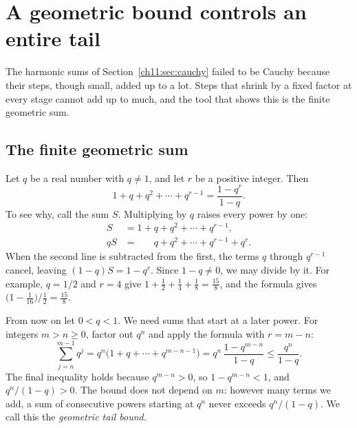 \section{A geometric bound controls an entire tail}\label{ch11:sec:geometric}
The harmonic sums of Section~\ref{ch11:sec:cauchy} failed to be Cauchy because their steps, though small, added up to a lot. Steps that shrink by a fixed factor at every stage cannot add up to much, and the tool that shows this is the finite geometric sum.

\subsection*{The finite geometric sum}
Let $q$ be a real number with $q\ne1$, and let $r$ be a positive integer. Then
\[
1+q+q^2+\cdots+q^{r-1}=\frac{1-q^r}{1-q}.
\]
To see why, call the sum $S$. Multiplying by $q$ raises every power by one:
\begin{align*}
 S&=1+q+q^2+\cdots+q^{r-1},\\
 qS&=\phantom{1+{}}q+q^2+\cdots+q^{r-1}+q^r.
\end{align*}
When the second line is subtracted from the first, the terms $q$ through $q^{r-1}$ cancel, leaving $(1-q)S=1-q^r$. Since $1-q\ne0$, we may divide by it. For example, $q=1/2$ and $r=4$ give $1+\tfrac12+\tfrac14+\tfrac18=\tfrac{15}8$, and the formula gives $\bigl(1-\tfrac1{16}\bigr)\big/\tfrac12=\tfrac{15}8$.

From now on let $0<q<1$. We need sums that start at a later power. For integers $m>n\ge0$, factor out $q^n$ and apply the formula with $r=m-n$:
\[
\sum_{j=n}^{m-1}q^j=q^n\bigl(1+q+\cdots+q^{m-n-1}\bigr)=q^n\,\frac{1-q^{m-n}}{1-q}\le\frac{q^n}{1-q}.
\]
The final inequality holds because $q^{m-n}>0$, so $1-q^{m-n}<1$, and $q^n/(1-q)>0$. The bound does not depend on $m$: however many terms we add, a sum of consecutive powers starting at $q^n$ never exceeds $q^n/(1-q)$. We call this the \emph{geometric tail bound}.

